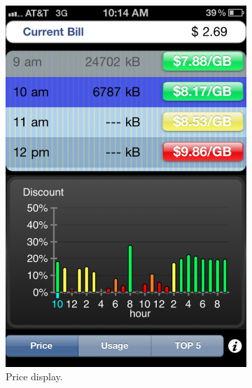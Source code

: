 \begin{figure}[t]
\begin{center}
\begin{subfigure}[b]{0.22\textwidth}
	\includegraphics[width=\textwidth]{Figures/iphone_ui1.pdf}
	\caption{Price display.}
\end{subfigure}
%
\begin{subfigure}[b]{0.22\textwidth}

\end{subfigure}
\end{center}
\end{figure}
